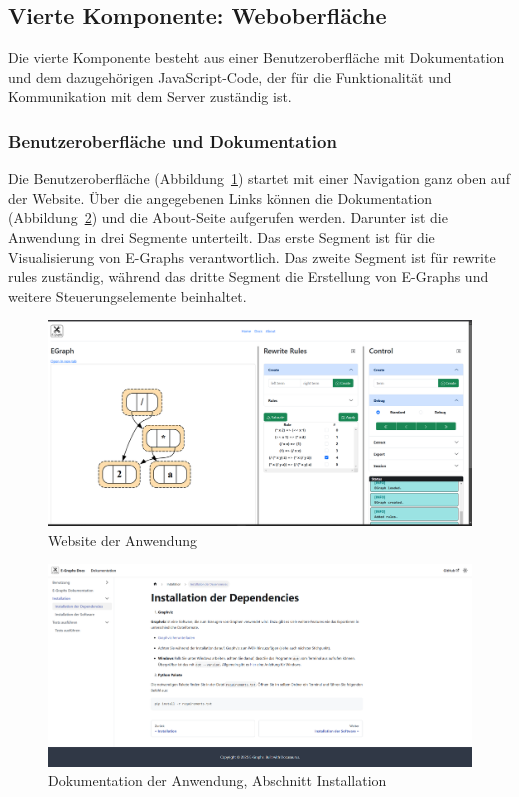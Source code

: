 \subsection{Vierte Komponente: Weboberfläche}

Die vierte Komponente besteht aus einer Benutzeroberfläche mit Dokumentation und dem dazugehörigen JavaScript-Code, der für die Funktionalität und Kommunikation mit dem Server
zuständig ist.

\subsubsection{Benutzeroberfläche und Dokumentation}

Die Benutzeroberfläche (Abbildung~\ref{fig:website}) startet mit einer Navigation ganz oben auf der Website. Über die angegebenen Links können die Dokumentation (Abbildung~\ref{fig:docs}) und die About-Seite aufgerufen werden.
Darunter ist die Anwendung in drei Segmente unterteilt. Das erste Segment ist für die Visualisierung von E-Graphs verantwortlich. Das zweite Segment ist für rewrite rules zuständig, während das dritte Segment
die Erstellung von E-Graphs und weitere Steuerungselemente beinhaltet.

\newpage
\begin{figure}[H]
\centering
\includegraphics[scale=0.42, angle=90]{../fig/website.png}
\caption{Website der Anwendung}
\label{fig:website}
\end{figure}
\newpage

\begin{figure}[H]
\centering
\includegraphics[scale=0.42, angle=90]{../fig/docs.png}
\caption{Dokumentation der Anwendung, Abschnitt Installation}
\label{fig:docs}
\end{figure}
\newpage

